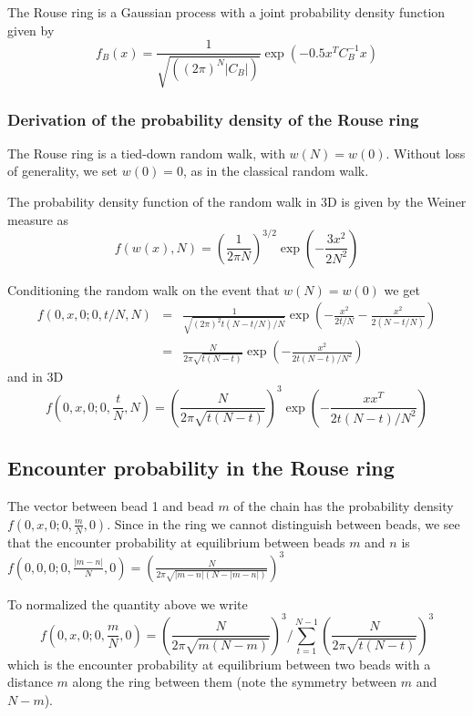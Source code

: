 \documentclass{report}
\begin{document}
The Rouse ring is a Gaussian process with a joint probability density function  given by  
\begin{equation*}
f_B(x)=\frac{1}{\sqrt{((2\pi)^N|C_B|)}}\exp(-0.5x^TC_B^{-1}x)
\end{equation*}

\subsubsection{Derivation of the probability density of the Rouse ring}
The Rouse ring is a tied-down random walk, with $w(N)=w(0)$. Without loss of generality, we set $w(0)=0$, as in the classical random walk.

The probability density function of the random walk in 3D is given by the Weiner measure as  
\begin{equation*}
f(w(x),N)=\left( \frac{1}{2\pi N}\right)^{3/2}\exp(-\frac{3x^2}{2N^2})
\end{equation*}

Conditioning the random walk on the event that $w(N)=w(0)$ we get 
\begin{eqnarray*}
f(0,x,0;0,t/N,N)&=&\frac{1}{\sqrt{(2\pi)^2 t(N-t/N)/N}}\exp(-\frac{x^2}{2t/N}-\frac{x^2}{2(N-t/N)})\\
&=&\frac{N}{2\pi\sqrt{t(N-t)}} \exp(-\frac{x^2}{2t(N-t)/N^2})
\end{eqnarray*}
and in 3D
\begin{equation*}
f(0,x,0;0,\frac{t}{N},N) = \left(\frac{N}{2\pi\sqrt{ t(N-t)}}\right)^3 \exp\left(-\frac{xx^T}{2t(N-t)/N^2}\right)
\end{equation*}

\subsection{Encounter probability in the Rouse ring}\label{subsection_encounterProbabilityInTheRing}
The vector between bead 1 and bead $m$ of the chain has the probability density 
$f(0,x,0;0,\frac{m}{N},0)$. Since in the ring we cannot distinguish between beads, we see that the encounter probability at equilibrium between beads $m$ and $n$ is 
$f(0,0,0;0,\frac{|m-n|}{N},0)=\left(\frac{N}{2\pi \sqrt{|m-n|(N-|m-n|)}}\right)^3$

To normalized the quantity above we write 
\begin{equation*}
f(0,x,0;0,\frac{m}{N},0)=\left(\frac{N}{2\pi\sqrt{m(N-m)}}\right)^3 /\sum_{t=1}^{N-1}\left(\frac{N}{2\pi\sqrt{t(N-t)}}\right)^3 
\end{equation*}
which is the encounter probability at equilibrium between two beads with a distance $m$ along the ring between them (note the symmetry between $m$ and $N-m$). 
\end{document}
